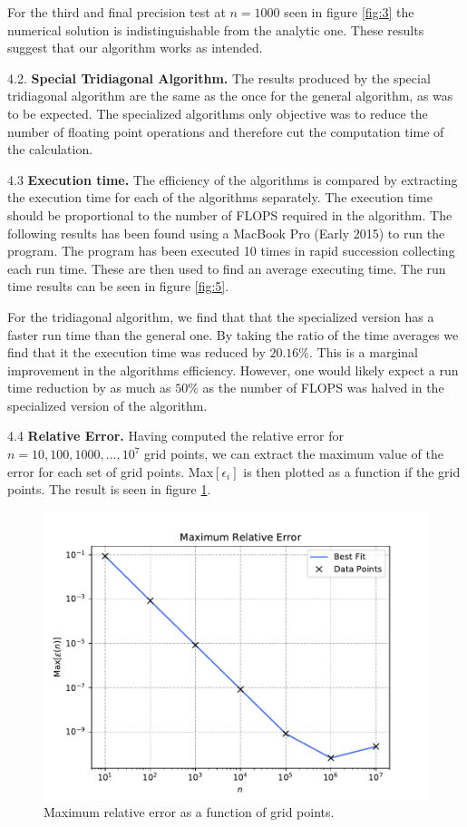 \documentclass[a4paper,10pt]{article}
\begin{document}
For the third and final precision test at $n = 1000$ seen in figure \ref{fig:3} the numerical solution is indistinguishable from the analytic one. These results suggest that our algorithm works as intended.

\bigskip

4.2. \textbf{Special Tridiagonal Algorithm.}
The results produced by the special tridiagonal algorithm are the same as the once for the general algorithm, as was to be expected. The specialized algorithms only objective was to reduce the number of floating point operations and therefore cut the computation time of the calculation. 

4.3 \textbf{Execution time.}
The efficiency of the algorithms is compared by extracting the execution time for each of the algorithms separately. The execution time should be proportional to the number of FLOPS required in the algorithm. The following results has been found using a MacBook Pro (Early 2015) to run the program. The program has been executed 10 times in rapid succession collecting each run time. These are then used to find an average executing time. The run time results can be seen in figure \ref{fig:5}. 

For the tridiagonal algorithm, we find that that the specialized version has a faster run time than the general one. By taking the ratio of the time averages we find that it the execution time was reduced by $20.16\%$. This is a marginal improvement in the algorithms efficiency. However, one would likely expect a run time reduction by as much as $50\%$ as the number of FLOPS was halved in the specialized version of the algorithm. 

4.4 \textbf{Relative Error.}
Having computed the relative error for $n = 10, 100, 1000, ..., 10^7$ grid points, we can extract the maximum value of the error for each set of grid points. Max$[\epsilon_i]$ is then plotted as a function if the grid points. The result is seen in figure \ref{fig:4}.

\begin{figure}[h]
  \centering
  \includegraphics[width=0.9\linewidth]{figures/rel_error_plot.pdf}
  \caption{Maximum relative error as a function of grid points.}
  \label{fig:4}
\end{figure}
\end{document}
